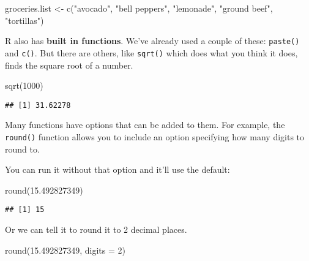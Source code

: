 \documentclass[
]{article}
\newenvironment{Shaded}{\begin{snugshade}}{\end{snugshade}}
\newcommand{\AttributeTok}[1]{\textcolor[rgb]{0.77,0.63,0.00}{#1}}
\newcommand{\DecValTok}[1]{\textcolor[rgb]{0.00,0.00,0.81}{#1}}
\newcommand{\FloatTok}[1]{\textcolor[rgb]{0.00,0.00,0.81}{#1}}
\newcommand{\FunctionTok}[1]{\textcolor[rgb]{0.00,0.00,0.00}{#1}}
\newcommand{\NormalTok}[1]{#1}
\newcommand{\OtherTok}[1]{\textcolor[rgb]{0.56,0.35,0.01}{#1}}
\newcommand{\StringTok}[1]{\textcolor[rgb]{0.31,0.60,0.02}{#1}}
\begin{document}
\begin{Shaded}
\begin{Highlighting}[]
\NormalTok{groceries.list }\OtherTok{\textless{}{-}} \FunctionTok{c}\NormalTok{(}\StringTok{"avocado"}\NormalTok{, }\StringTok{"bell peppers"}\NormalTok{, }\StringTok{"lemonade"}\NormalTok{, }\StringTok{"ground beef"}\NormalTok{, }\StringTok{"tortillas"}\NormalTok{)}
\end{Highlighting}
\end{Shaded}

R also has \textbf{built in functions}. We've already used a couple of
these: \texttt{paste()} and \texttt{c()}. But there are others, like
\texttt{sqrt()} which does what you think it does, finds the square root
of a number.

\begin{Shaded}
\begin{Highlighting}[]
\FunctionTok{sqrt}\NormalTok{(}\DecValTok{1000}\NormalTok{)}
\end{Highlighting}
\end{Shaded}

\begin{verbatim}
## [1] 31.62278
\end{verbatim}

Many functions have options that can be added to them. For example, the
\texttt{round()} function allows you to include an option specifying how
many digits to round to.

You can run it without that option and it'll use the default:

\begin{Shaded}
\begin{Highlighting}[]
\FunctionTok{round}\NormalTok{(}\FloatTok{15.492827349}\NormalTok{)}
\end{Highlighting}
\end{Shaded}

\begin{verbatim}
## [1] 15
\end{verbatim}

Or we can tell it to round it to 2 decimal places.

\begin{Shaded}
\begin{Highlighting}[]
\FunctionTok{round}\NormalTok{(}\FloatTok{15.492827349}\NormalTok{, }\AttributeTok{digits =} \DecValTok{2}\NormalTok{)}
\end{Highlighting}
\end{Shaded}
\end{document}
